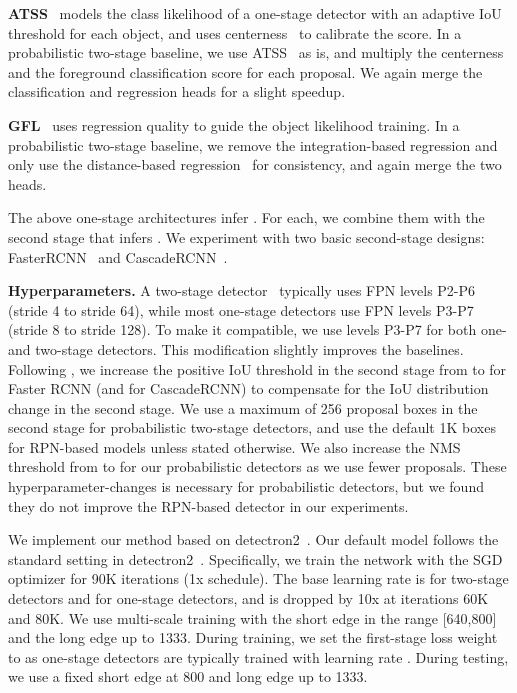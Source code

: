 \documentclass{article}
\renewcommand{\paragraph}[1]{\noindent\textbf{#1}}
\begin{document}
\textbf{ATSS}~\cite{zhang2020bridging} models the class likelihood of a one-stage detector with an adaptive IoU threshold for each object, and uses centerness~\cite{tian2019fcos} to calibrate the score.
In a probabilistic two-stage baseline, we use ATSS~\cite{zhang2020bridging} as is, and multiply the centerness and the foreground classification score for each proposal.
We again merge the classification and regression heads for a slight speedup.

\textbf{GFL}~\cite{li2020generalized} uses regression quality to guide the object likelihood training.
In a probabilistic two-stage baseline, we remove the integration-based regression and only use the distance-based regression~\cite{tian2019fcos} for consistency, and again merge the two heads.

The above one-stage architectures infer .
For each, we combine them with the second stage that infers .
We experiment with two basic second-stage designs: FasterRCNN~\cite{ren2015faster} and CascadeRCNN~\cite{cai2018cascade}.



\paragraph{Hyperparameters.}
A two-stage detector~\cite{ren2015faster} typically uses FPN levels P2-P6 (stride 4 to stride 64), while most one-stage detectors use FPN levels P3-P7 (stride 8 to stride 128).
To make it compatible, we use levels P3-P7 for both one- and two-stage detectors.
This modification slightly improves the baselines.
Following \citet{wang2019region}, we increase the positive IoU threshold in the second stage from  to  for Faster RCNN (and  for CascadeRCNN)
to compensate for the IoU distribution change in the second stage.
We use a maximum of 256 proposal boxes in the second stage for probabilistic two-stage detectors, and use the default 1K boxes for RPN-based models unless stated otherwise.
We also increase the NMS threshold from  to  for our probabilistic detectors as we use fewer proposals.
These hyperparameter-changes is necessary for probabilistic detectors, but we found they do not improve the RPN-based detector in our experiments. 


We implement our method based on detectron2~\cite{wu2019detectron2}.
Our default model follows the standard setting in detectron2~\cite{wu2019detectron2}.
Specifically, we train the network with the SGD optimizer for 90K iterations (1x schedule).
The base learning rate is  for two-stage detectors and  for one-stage detectors, 
and is dropped by 10x at iterations 60K and 80K.
We use multi-scale training with the short edge in the range [640,800] and the long edge up to 1333.
During training, we set the first-stage loss weight to  as one-stage detectors are typically trained with learning rate .
During testing, we use a fixed short edge at 800 and long edge up to 1333.
\end{document}
